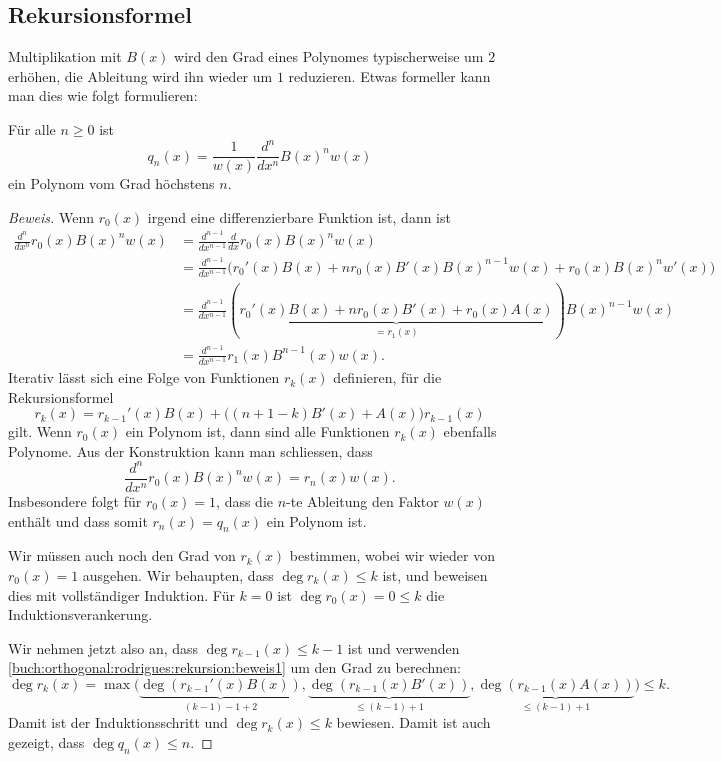 %
%
\subsection{Rekursionsformel}
Multiplikation mit $B(x)$ wird den Grad eines Polynomes typischerweise 
um $2$ erhöhen, die Ableitung wird ihn wieder um $1$ reduzieren.
Etwas formeller kann man dies wie folgt formulieren:

\begin{satz}
%
Für alle $n\ge 0$ ist
\begin{equation}
q_n(x)
=
\frac{1}{w(x)}
\frac{d^n}{dx^n} B(x)^n w(x)
\label{buch:orthogonalitaet:rodrigues:eqn:rekursion}
\end{equation}
ein Polynom vom Grad höchstens $n$.
\end{satz}

\begin{proof}[Beweis]
Wenn $r_0(x)$ irgend eine differenzierbare Funktion ist, dann ist
\begin{align*}
\frac{d^n}{dx^n}
r_0(x) B(x)^n w(x)
&=
\frac{d^{n-1}}{dx^{n-1}}\frac{d}{dx} r_0(x) B(x)^n w(x)
\\
&=
\frac{d^{n-1}}{dx^{n-1}}
\bigl(r_0'(x)B(x)+ nr_0(x)B'(x)B(x)^{n-1}w(x) + r_0(x)B(x)^n w'(x) \bigr)
\\
&=
\frac{d^{n-1}}{dx^{n-1}}
(\underbrace{r_0'(x)B(x)+nr_0(x)B'(x)+r_0(x)A(x)}_{\displaystyle = r_1(x)})
B(x)^{n-1} w(x)
\\
&=
\frac{d^{n-1}}{dx^{n-1}} r_1(x)B^{n-1}(x) w(x).
\end{align*}
Iterativ lässt sich eine Folge von
Funktionen $r_k(x)$ definieren, für die Rekursionsformel
\begin{equation}
r_k(x) = r_{k-1}'(x)B(x) + \bigl((n+1-k)B'(x) + A(x)\bigr)r_{k-1}(x)
\label{buch:orthogonal:rodrigues:rekursion:beweis1}
\end{equation}
gilt.
Wenn $r_0(x)$ ein Polynom ist, dann sind alle Funktionen $r_k(x)$
ebenfalls Polynome.
Aus der Konstruktion kann man schliessen, dass
\[
\frac{d^n}{dx^n} r_0(x) B(x)^n w(x)
=
r_n(x) w(x).
\]
Insbesondere folgt für $r_0(x)=1$, dass die $n$-te Ableitung den
Faktor $w(x)$ enthält und dass somit $r_n(x)=q_n(x)$ ein Polynom ist.

Wir müssen auch noch den Grad von $r_k(x)$ bestimmen, wobei wir
wieder von $r_0(x)=1$ ausgehen.
Wir behaupten, dass $\deg r_k(x)\le k$ ist, und beweisen dies
mit vollständiger Induktion.
Für $k=0$ ist $\deg r_0(x) = 0 \le k$ die Induktionsverankerung.

Wir nehmen jetzt also an, dass $\deg r_{k-1}(x)\le k-1$ ist und
verwenden 
\eqref{buch:orthogonal:rodrigues:rekursion:beweis1} um den Grad zu berechnen:
\begin{equation*}
\deg r_k(x)
=
\max \bigl(
\underbrace{\deg(r_{k-1}'(x) B(x))}_{\displaystyle (k-1) -1 + 2}
,
\underbrace{\deg(r_{k-1}(x)B'(x))}_{\displaystyle \le (k-1)+1}
,
\underbrace{\deg(r_{k-1}(x)A(x))}_{\displaystyle \le (k-1)+1}
\bigr)
\le k.
\end{equation*}
Damit ist der Induktionsschritt und $\deg r_k(x)\le k$ bewiesen.
Damit ist auch gezeigt, dass $\deg q_n(x)\le n$.
\end{proof}

